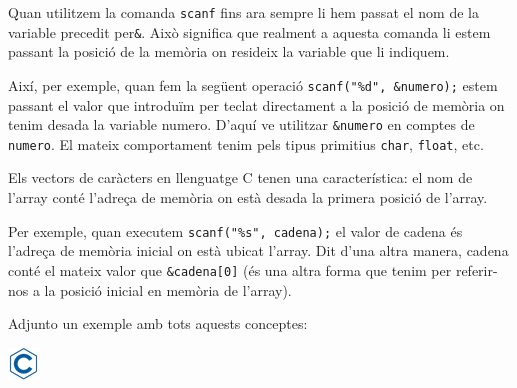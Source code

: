 \documentclass[]{book}
\begin{document}
Quan utilitzem la comanda \texttt{scanf} fins ara sempre li hem passat
el nom de la variable precedit per\texttt{\&}. Això significa que
realment a aquesta comanda li estem passant la posició de la memòria on
resideix la variable que li indiquem.

Així, per exemple, quan fem la següent operació
\texttt{scanf("\%d",\ \&numero);} estem passant el valor que introduïm
per teclat directament a la posició de memòria on tenim desada la
variable numero. D'aquí ve utilitzar \texttt{\&numero} en comptes de
\texttt{numero}. El mateix comportament tenim pels tipus primitius
\texttt{char}, \texttt{float}, etc.

Els vectors de caràcters en llenguatge C tenen una característica: el
nom de l'array conté l'adreça de memòria on està desada la primera
posició de l'array.

Per exemple, quan executem \texttt{scanf("\%s",\ cadena);} el valor de
cadena és l'adreça de memòria inicial on està ubicat l'array. Dit d'una
altra manera, cadena conté el mateix valor que \texttt{\&cadena{[}0{]}}
(és una altra forma que tenim per referir-nos a la posició inicial en
memòria de l'array).

Adjunto un exemple amb tots aquests conceptes:

\includegraphics{./img/c.png}
\end{document}
